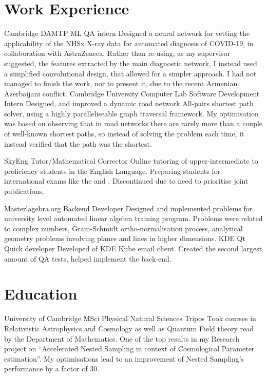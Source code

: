 \documentclass{CurriculumVitae}[10pt, draft, condensed]
\begin{document}
 \section*{Work Experience} {\setlength{\parindent}{0in}
    {Cambridge DAMTP} {ML QA intern} {Designed a
     neural network for vetting the applicability of the NHSx X-ray
     data for automated diagnosis of COVID-19, in collaboration with
     AstraZeneca. Rather than re-using, as my supervisor suggested,
     the features extracted by the main diagnostic network, I instead
     used a simplified convolutional design, that allowed for a
     simpler approach.  I had not managed to finish the work, nor to
     present it, due to the recent Armenian Azerbaijani conflict.}
    {Cambridge University Computer Lab}
   {Software Development Intern} {Designed, and improved a dynamic
     road network All-pairs shortest path solver, using a highly
     paralleliseable graph traversal framework. My optimisation was
     based on observing that in road networks there are rarely more
     than a couple of well-known shortest paths, so instead of solving
     the problem each time, it instead verified that the path was the
     shortest.}

    {SkyEng} {Tutor/Mathematical
     Corrector} {Online tutoring of upper-intermediate to proficiency
     students in the English Language. Preparing students for
     international exams like the  
     and . Discontinued due to need to prioritise joint
     publications.}

    {Masterlagebra.org} {Backend Developer}
   {Designed and implemented problems for university level automated
     linear algebra training program. Problems were related to complex
     numbers, Gram-Schmidt ortho-normalisation process, analytical
     geometry problems involving planes and lines in higher
     dimensions. }
    {KDE} {Qt Quick developer}
   {Developed of KDE Kube email client. Created the second largest
     amount of QA tests, helped implement the  back-end. }


\section*{Education}
 {University of Cambridge} {MSci } {
  Physical Natural Sciences Tripos} {Took courses in Relativistic
  Astrophysics and Cosmology as well as Quantum Field theory read by
  the Department of Mathematics. One of the top results in my Research
  project on ``Accelerated Nested Sampling in context of Cosmological
  Parameter estimation''. My optimisations lead to an improvement of
  Nested Sampling's performance by a factor of 30. }


}
\end{document}
